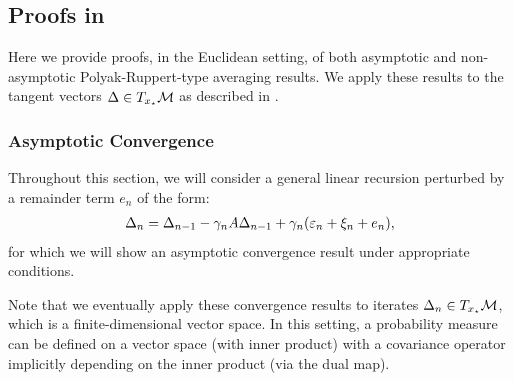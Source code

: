 \subsection{Proofs in } \label{sec:conv_rates}
Here we provide proofs, in the Euclidean setting, of both asymptotic and non-asymptotic Polyak-Ruppert-type averaging results. We apply these results to the tangent vectors $\Delta \in T_{x_\star}\mathcal{M}$ as described in .
\subsubsection{Asymptotic Convergence}
Throughout this section, we will consider a general linear recursion perturbed by a remainder term $e_n$ of the form:
\begin{align}
  \Delta_{n}=\Delta_{n-1} -\gamma_n A \Delta_{n-1}+ \gamma_n (\varepsilon_n+\xi_{n}+e_{n}), \label{eq:rec_with_error1}
\end{align}
for which we will show an asymptotic convergence result under appropriate conditions.  

Note that we eventually apply these convergence results to iterates $\Delta_n \in T_{x_\star} \mathcal{M}$, which is a finite-dimensional vector space. In this setting, a probability measure can be defined on a vector space (with inner product) with a covariance operator implicitly depending on the inner product (via the dual map). 

